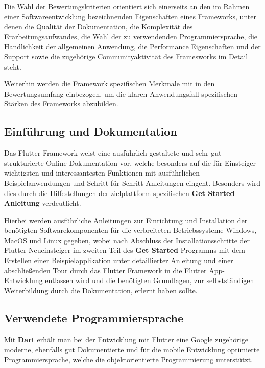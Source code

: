 \documentclass[bibliography=totoc,listof=totoc,BCOR=5mm,DIV=12,oneside]{scrbook}
\begin{document}
\par \bigskip Die Wahl der Bewertungskriterien orientiert sich einerseits an den im Rahmen einer Softwareentwicklung bezeichnenden Eigenschaften eines Frameworks, unter denen die Qualität der Dokumentation, die Komplexität des Erarbeitungsaufwandes, die Wahl der zu verwendenden Programmiersprache, die  Handlichkeit der allgemeinen Anwendung, die Performance Eigenschaften und der Support sowie die zugehörige Communityaktivität des Framesworks im Detail steht. \par Weiterhin werden die Framework spezifischen Merkmale mit in den Bewertungsumfang einbezogen, um die klaren Anwendungsfall spezifischen Stärken des Frameworks abzubilden.

\subsection{Einführung und Dokumentation}
\par Das Flutter Framework weist eine ausführlich gestaltete und sehr gut strukturierte Online Dokumentation vor, welche besonders auf die für Einsteiger wichtigsten und interessantesten Funktionen mit ausführlichen Beispielanwendungen und Schritt-für-Schritt Anleitungen eingeht.
Besonders wird dies durch die Hilfestellungen der zielplattform-spezifischen \textbf{Get Started Anleitung}\citep{FlutterGetStarted}  verdeutlicht.

\par \bigskip Hierbei werden ausführliche Anleitungen zur Einrichtung und Installation der benötigten Softwarekomponenten für die verbreiteten Betriebssysteme Windows, MacOS und Linux  gegeben, wobei nach Abschluss der Installationsschritte der Flutter Neueinsteiger im zweiten Teil des \textbf{Get Started} Programms mit dem Erstellen einer Beispielapplikation unter detaillierter Anleitung und einer abschließenden Tour durch das Flutter Framework in die Flutter App-Entwicklung entlassen wird und die benötigten Grundlagen, zur selbstständigen Weiterbildung durch die Dokumentation, erlernt haben sollte. 

\subsection{Verwendete Programmiersprache}
\par Mit \textbf{Dart}\citep{DartLangHomepage} erhält man bei der Entwicklung mit Flutter eine Google zugehörige moderne, ebenfalls gut Dokumentierte und für die mobile Entwicklung optimierte Programmiersprache, welche die objektorientierte Programmierung unterstützt. 
\end{document}
